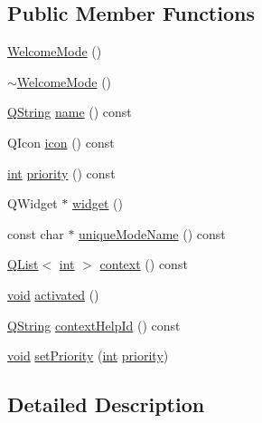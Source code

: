 \subsection*{Public Member Functions}
\begin{DoxyCompactItemize}
\item 
\hyperlink{group___welcome_plugin_gaddea844272aa36b99c5ebe5e095a70ab}{Welcome\-Mode} ()
\item 
\hyperlink{group___welcome_plugin_ga5c6c667541394b36ddf50c9ae263f9b2}{$\sim$\-Welcome\-Mode} ()
\item 
\hyperlink{group___u_a_v_objects_plugin_gab9d252f49c333c94a72f97ce3105a32d}{Q\-String} \hyperlink{group___welcome_plugin_ga7586dbc104467d1a590fa2e0d723ab5c}{name} () const 
\item 
Q\-Icon \hyperlink{group___welcome_plugin_ga88caad9f6c1d3a4d16f7ee399706cf86}{icon} () const 
\item 
\hyperlink{ioapi_8h_a787fa3cf048117ba7123753c1e74fcd6}{int} \hyperlink{group___welcome_plugin_gae1d1437fdc5e83102dc1da5cc809834f}{priority} () const 
\item 
Q\-Widget $\ast$ \hyperlink{group___welcome_plugin_gad367aa736459da2ada111a3944f2a28d}{widget} ()
\item 
const char $\ast$ \hyperlink{group___welcome_plugin_gaddd517d76cbff2b9bb0c8e0d672bdcab}{unique\-Mode\-Name} () const 
\item 
\hyperlink{class_q_list}{Q\-List}$<$ \hyperlink{ioapi_8h_a787fa3cf048117ba7123753c1e74fcd6}{int} $>$ \hyperlink{group___welcome_plugin_ga740b152623be8ca1d5f9f22e2b4b5bc4}{context} () const 
\item 
\hyperlink{group___u_a_v_objects_plugin_ga444cf2ff3f0ecbe028adce838d373f5c}{void} \hyperlink{group___welcome_plugin_gac79769eb6bfa95dfa1be3459b92e1d60}{activated} ()
\item 
\hyperlink{group___u_a_v_objects_plugin_gab9d252f49c333c94a72f97ce3105a32d}{Q\-String} \hyperlink{group___welcome_plugin_ga5350ee5cd5a50d966eb0b2522e888183}{context\-Help\-Id} () const 
\item 
\hyperlink{group___u_a_v_objects_plugin_ga444cf2ff3f0ecbe028adce838d373f5c}{void} \hyperlink{group___welcome_plugin_ga5e3a43a28b1cf87122fbb4a8872acb69}{set\-Priority} (\hyperlink{ioapi_8h_a787fa3cf048117ba7123753c1e74fcd6}{int} \hyperlink{group___welcome_plugin_gae1d1437fdc5e83102dc1da5cc809834f}{priority})
\end{DoxyCompactItemize}


\subsection{Detailed Description}



